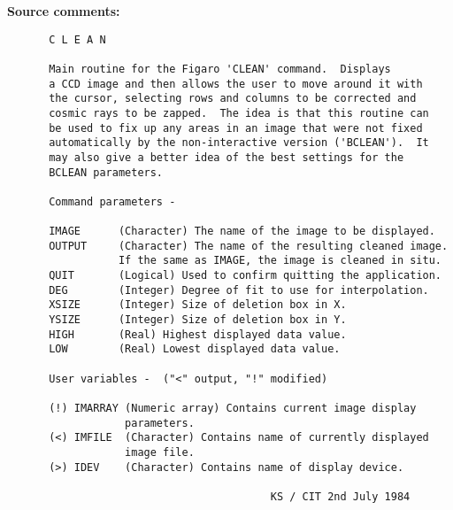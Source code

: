 \begin{description}
\item [{\bf Source comments:}]
\begin{verbatim}
 C L E A N

 Main routine for the Figaro 'CLEAN' command.  Displays
 a CCD image and then allows the user to move around it with
 the cursor, selecting rows and columns to be corrected and
 cosmic rays to be zapped.  The idea is that this routine can
 be used to fix up any areas in an image that were not fixed
 automatically by the non-interactive version ('BCLEAN').  It
 may also give a better idea of the best settings for the
 BCLEAN parameters.

 Command parameters -

 IMAGE      (Character) The name of the image to be displayed.
 OUTPUT     (Character) The name of the resulting cleaned image.
            If the same as IMAGE, the image is cleaned in situ.
 QUIT       (Logical) Used to confirm quitting the application.
 DEG        (Integer) Degree of fit to use for interpolation.
 XSIZE      (Integer) Size of deletion box in X.
 YSIZE      (Integer) Size of deletion box in Y.
 HIGH       (Real) Highest displayed data value.
 LOW        (Real) Lowest displayed data value.

 User variables -  ("<" output, "!" modified)

 (!) IMARRAY (Numeric array) Contains current image display
             parameters.
 (<) IMFILE  (Character) Contains name of currently displayed
             image file.
 (>) IDEV    (Character) Contains name of display device.

                                    KS / CIT 2nd July 1984
\end{verbatim}
\end{description}
